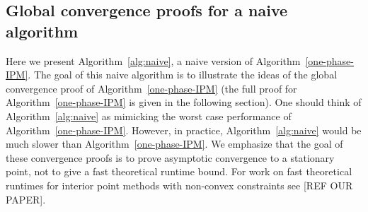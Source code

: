 \documentclass{article}
\begin{document}
\subsection{Global convergence proofs for a naive algorithm}\label{sec:theory-naive}

Here we present Algorithm~\ref{alg:naive}, a naive version of Algorithm~\ref{one-phase-IPM}. The goal of this naive algorithm is to illustrate the ideas of the global convergence proof of Algorithm~\ref{one-phase-IPM} (the full proof for Algorithm~\ref{one-phase-IPM} is given in the following section). One should think of Algorithm~\ref{alg:naive} as mimicking the worst case performance of Algorithm~\ref{one-phase-IPM}. However, in practice, Algorithm~\ref{alg:naive} would be much slower than  Algorithm~\ref{one-phase-IPM}. We emphasize that the goal of these convergence proofs is to prove asymptotic convergence to a stationary point, not to give a fast theoretical runtime bound. For work on fast theoretical runtimes for interior point methods with non-convex constraints see [REF OUR PAPER]. 
\end{document}
